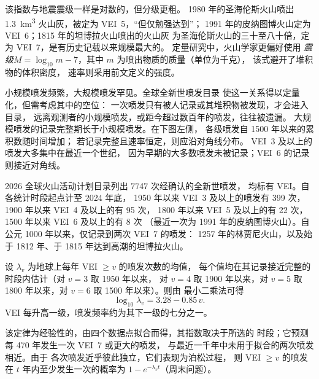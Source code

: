 该指数与地震震级一样是对数的，但分级更粗。
1980 年的圣海伦斯火山喷出 \qty{1.3}{km^3} 火山灰，被定为 VEI~5，“但仅勉强达到”；
1991 年的皮纳图博火山定为 VEI~6；1815 年的坦博拉火山喷出的火山灰
为圣海伦斯火山的三十至八十倍，定为 VEI~7，是有历史记载以来规模最大的。
定量研究中，火山学家更偏好使用
\emph{震级}$M = \log_{10}m - 7$，其中 $m$ 为喷出物质的质量（单位为千克），
该式避开了堆积物的体积密度，
速率则采用前文定义的强度。

小规模喷发频繁，大规模喷发罕见。全球全新世喷发目录
使这一关系得以定量化，但需考虑其中的空位：
一次喷发只有被人记录或其堆积物被发现，才会进入目录，
远离观测者的小规模喷发，或距今超过数百年的喷发，往往被遗漏。
大规模喷发的记录完整期长于小规模喷发。在下图左侧，
各级喷发自 1500 年以来的累积数随时间增加；
若记录完整且速率恒定，则应沿对角线分布。
VEI~3 及以上的喷发大多集中在最近一个世纪，
因为早期的大多数喷发未被记录；VEI~6 的记录
则接近对角线。

\begin{dated}{2026}
全球火山活动计划目录列出 \num{7747} 次经确认的全新世喷发，
均标有 VEI。自各统计时段起点计至 2024 年底，
1950 年以来 VEI~3 及以上的喷发有 399 次，1900 年以来 VEI~4 及以上的有 95 次，
1800 年以来 VEI~5 及以上的有 22 次，1500 年以来 VEI~6 及以上的有 8 次
（最近一次为 1991 年的皮纳图博火山）。自公元 1000 年以来，仅记录到两次 VEI~7 的喷发：
1257 年的林贾尼火山，以及始于 1812 年、于
1815 年达到高潮的坦博拉火山。
\end{dated}

\begin{proposition}\label{prop:b2:eruptive-styles:frequency}
设 $\lambda_v$ 为地球上每年 VEI $\ge v$ 的喷发次数的均值，
每个值均在其记录接近完整的时段内估计（对 $v = 3$ 取 1950 年以来，
对 $v = 4$ 取 1900 年以来，对 $v = 5$ 取 1800 年以来，对 $v = 6$ 取 1500 年以来）。则由
最小二乘法可得
\[
\log_{10}\lambda_v = 3.28 - 0.85\,v .
\]
VEI 每升高一级，喷发频率约为其下一级的七分之一。
\end{proposition}

该定律为经验性的，由四个数据点拟合而得，其指数取决于所选的
时段；它预测每 \num{470} 年发生一次 VEI~7 或更大的喷发，
与最近一千年中未用于拟合的两次喷发相近。由于
各次喷发近乎彼此独立，它们表现为泊松过程，
则 VEI $\ge v$ 的喷发在 $t$ 年内至少发生一次的概率为
$1 - e^{-\lambda_vt}$（周末问题）。

